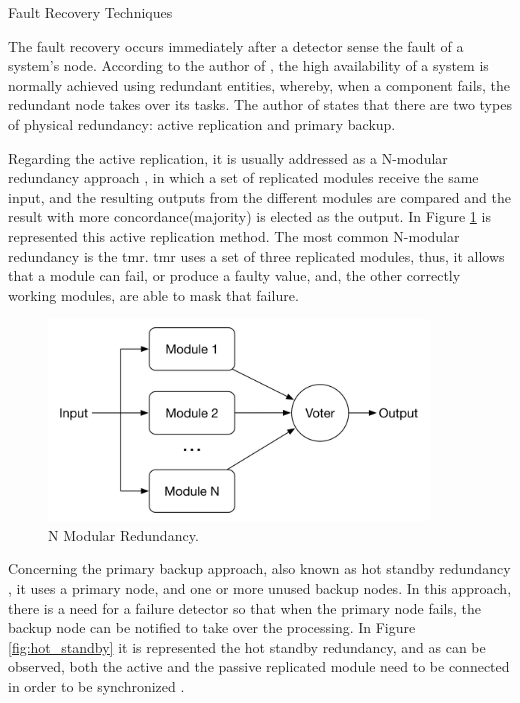 \begin{Paragraph}{Fault Recovery Techniques}

The fault recovery occurs immediately after a detector sense the fault of a system's node. According to the author of \cite{Schweiz}, the high availability of a system is normally achieved using redundant entities, whereby, when a component fails, the redundant node takes over its tasks. The author of \cite{Redwine} states that there are two types of physical redundancy: active replication and primary backup. 

Regarding the active replication, it is usually addressed as a N-modular redundancy approach \cite{Schweiz}, in which a set of replicated modules receive the same input, and the resulting outputs from the different modules are compared and the result with more concordance(majority) is elected as the output. In Figure \ref{fig:nmodular} is represented this active replication method. The most common N-modular redundancy is the \acf{tmr}. \ac{tmr} uses a set of three replicated modules, thus, it allows that a module can fail, or produce a faulty value, and, the other correctly working modules, are able to mask that failure. 
	
	\begin{figure}[H]
		\centering
		\includegraphics[width=0.9\textwidth]{figures/nmodular.png}
		\caption{N Modular Redundancy.}
		\label{fig:nmodular}
	\end{figure}

Concerning the primary backup approach, also known as hot standby redundancy \cite{Schweiz}, it uses a primary node, and one or more unused backup nodes. In this approach, there is a need for a failure detector so that when the primary node fails, the backup node can be notified to take over the processing. In Figure \ref{fig:hot_standby} it is represented the hot standby redundancy, and as can be observed, both the active and the passive replicated module need to be connected in order to be synchronized \cite{Schweiz}. 


\end{Paragraph}
